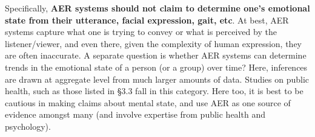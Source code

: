 \documentclass{clv3}
\begin{document}
Specifically, \textbf{AER systems should not claim to determine one's emotional state from their utterance, facial expression, gait, etc}. At best, AER systems capture what one is trying to convey or what is perceived by the listener/viewer, and even there, given the complexity of human expression, they are often inaccurate.
A separate question is whether AER systems can determine trends in the emotional state of a person (or a group) over time? Here, inferences are drawn at aggregate level from much larger amounts of data. Studies on public health, such as those listed in \S3.3 fall in this category. Here too, it is best to be cautious in making claims about mental state, and use AER as one source of evidence amongst many (and involve expertise from public health and psychology).\\
\end{document}
